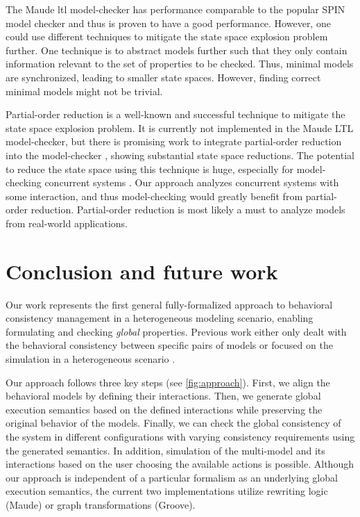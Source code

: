 \documentclass{jot}
\begin{document}
The Maude \gls*{ltl} model-checker has performance comparable to the popular SPIN model checker \cite{ekerMaudeLTLModel2004} and thus is proven to have a good performance.
However, one could use different techniques to mitigate the state space explosion problem further.
One technique is to abstract models further such that they only contain information relevant to the set of properties to be checked.
Thus, minimal models are synchronized, leading to smaller state spaces.
However, finding correct minimal models might not be trivial.

Partial-order reduction is a well-known and successful technique to mitigate the state space explosion problem.
It is currently not implemented in the Maude LTL model-checker, but there is promising work to integrate partial-order reduction into the model-checker \cite{farzanPartialOrderReduction2007}, showing substantial state space reductions.
The potential to reduce the state space using this technique is huge, especially for model-checking concurrent systems \cite{clarkeHandbookModelChecking2018}.
Our approach analyzes concurrent systems with some interaction, and thus model-checking would greatly benefit from partial-order reduction.
Partial-order reduction is most likely a must to analyze models from real-world applications.

\section{Conclusion and future work} \label{sec:conclusion_and_future_work}
Our work represents the first general fully-formalized approach to behavioral consistency management in a heterogeneous modeling scenario, enabling formulating and checking \emph{global} properties.
Previous work either only dealt with the behavioral consistency between specific pairs of models \cite{yaoConsistencyCheckingUML2006, kusterExplicitBehavioralConsistency2003} or focused on the simulation in a heterogeneous scenario \cite{deantoniModelingBehavioralSemantics2016, varalarsenBCoolBehavioralCoordination2016, ekerTamingHeterogeneityPtolemy2003, leeDisciplinedHeterogeneousModeling2010}.

Our approach follows three key steps (see \autoref{fig:approach}).
First, we align the behavioral models by defining their interactions.
Then, we generate global execution semantics based on the defined interactions while preserving the original behavior of the models.
Finally, we can check the global consistency of the system in different configurations with varying consistency requirements using the generated semantics.
In addition, simulation of the multi-model and its interactions based on the user choosing the available actions is possible.
Although our approach is independent of a particular formalism as an underlying global execution semantics, the
current two implementations utilize rewriting logic (Maude) or graph transformations (Groove).
\end{document}
